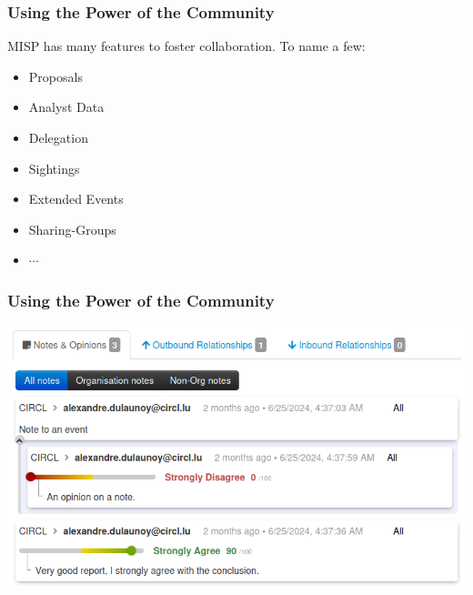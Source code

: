 \begin{frame}
    \frametitle{Using the Power of the Community}
    MISP has many features to foster collaboration. To name a few:
    \begin{itemize}
        \item Proposals
        \item Analyst Data
        \item Delegation
        \item Sightings
        \item Extended Events
        \item Sharing-Groups
        \item $\cdots$
    \end{itemize}
\end{frame}

\begin{frame}
    \frametitle{Using the Power of the Community}
    \begin{center}
        \includegraphics[width=0.85\linewidth]{analyst-data.png}
    \end{center}
\end{frame}

